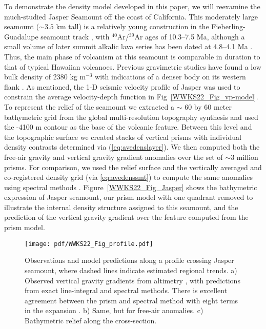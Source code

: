 To demonstrate the density model developed in this paper, we will reexamine the much-studied Jasper Seamount off
the coast of California. This moderately large seamount ($\sim 3.5$ km tall) is a relatively young construction
in the Fieberling-Guadalupe seamount track \citep{B1989}, with $^{40}$Ar/$^{39}$Ar ages of 10.3--7.5 Ma, although a
small volume of later summit alkalic lava series has been dated at 4.8--4.1 Ma \citep{PSG91}. Thus, the main phase
of volcanism at this seamount is comparable in duration to that of typical Hawaiian volcanoes.  Previous gravimetric
studies have found a low bulk density of 2380 kg m$^{-3}$ with indications of a denser body on its western flank
\citep{H1991}. As mentioned, the 1-D seismic velocity profile of Jasper \citep{H1994} was used to constrain the average
velocity-depth function in Fig~\ref{WWKS22_Fig_vp-model}. To represent the relief of the seamount we extracted a
$\sim$ 60 by 60 meter bathymetric grid from the global multi-resolution topography synthesis \citep{R2009} and used
the -4100 m contour as the base of the volcanic feature.  Between this level and the topographic surface we created
stacks of vertical prisms with individual density contrasts determined via (\ref{eq:avedenslayer}).
We then computed both the free-air gravity and vertical gravity gradient anomalies over the set of $\sim 3$ million
prisms. For comparison, we used the relief surface and the vertically averaged and co-registered density grid
(via \ref{eq:avedenssmt}) to compute the same anomalies using spectral methods \citep{P1972}.
Figure~\ref{WWKS22_Fig_Jasper} shows the bathymetric expression of Jasper seamount, our prism model with one quadrant
removed to illustrate the internal density structure assigned to this seamount, and the prediction of the
vertical gravity gradient over the feature computed from the prism model.

\begin{figure}
\centering
\texttt{[image: pdf/WWKS22\_Fig\_profile.pdf]}
\caption{Observations and model predictions along a profile crossing Jasper seamount, where dashed lines indicate
estimated regional trends. a) Observed vertical gravity gradients from altimetry \citep{Setal2021}, with predictions
from exact line-integral and spectral methods.  There is excellent agreement between the prism and spectral method
with eight terms in the expansion \citep{P1972}. b) Same, but for free-air anomalies. c) Bathymetric relief along the
cross-section.}
\label{WWKS22_Fig_profile}
\end{figure}

